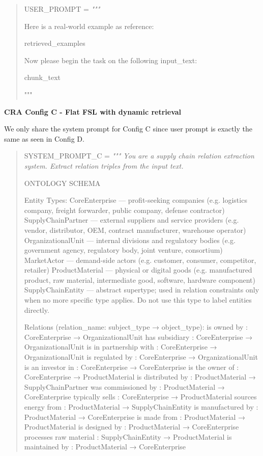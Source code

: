 \begin{quote}
{
USER\_PROMPT = 
\itshape 
"""

Here is a real-world example as reference: 

{retrieved\_examples}

Now please begin the task on the following input\_text: 

{chunk\_text}

"""
}
\end{quote}

\textbf{CRA Config C - Flat FSL with dynamic retrieval}

We only share the system prompt for Config C since user prompt is exactly the same as seen in Config D. 

\begin{quote}
{
SYSTEM\_PROMPT\_C = 
\itshape
"""
You are a supply chain relation extraction system. Extract relation triples from the input text.


ONTOLOGY SCHEMA

Entity Types:
  CoreEnterprise       — profit-seeking companies
                         (e.g. logistics company, freight forwarder, 
                          public company, defense contractor)
  SupplyChainPartner   — external suppliers and service providers
                         (e.g. vendor, distributor, OEM, 
                          contract manufacturer, warehouse operator)
  OrganizationalUnit   — internal divisions and regulatory bodies
                         (e.g. government agency, regulatory body, 
                          joint venture, consortium)
  MarketActor          — demand-side actors
                         (e.g. customer, consumer, competitor, retailer)
  ProductMaterial      — physical or digital goods
                         (e.g. manufactured product, raw material, 
                          intermediate good, software, hardware component)
  SupplyChainEntity    — abstract supertype; used in relation constraints
                         only when no more specific type applies.
                         Do not use this type to label entities directly.

Relations (relation\_name: subject\_type → object\_type):
  is owned by               : CoreEnterprise      → OrganizationalUnit
  has subsidiary            : CoreEnterprise      → OrganizationalUnit
  is in partnership with    : CoreEnterprise      → OrganizationalUnit
  is regulated by           : CoreEnterprise      → OrganizationalUnit
  is an investor in         : CoreEnterprise      → CoreEnterprise
  is the owner of           : CoreEnterprise      → ProductMaterial
  is distributed by         : ProductMaterial     → SupplyChainPartner
  was commissioned by       : ProductMaterial     → CoreEnterprise
  typically sells           : CoreEnterprise      → ProductMaterial
  sources energy from       : ProductMaterial     → SupplyChainEntity
  is manufactured by        : ProductMaterial     → CoreEnterprise
  is made from              : ProductMaterial     → ProductMaterial
  is designed by            : ProductMaterial     → CoreEnterprise
  processes raw material    : SupplyChainEntity   → ProductMaterial
  is maintained by          : ProductMaterial     → CoreEnterprise


}
\end{quote}
